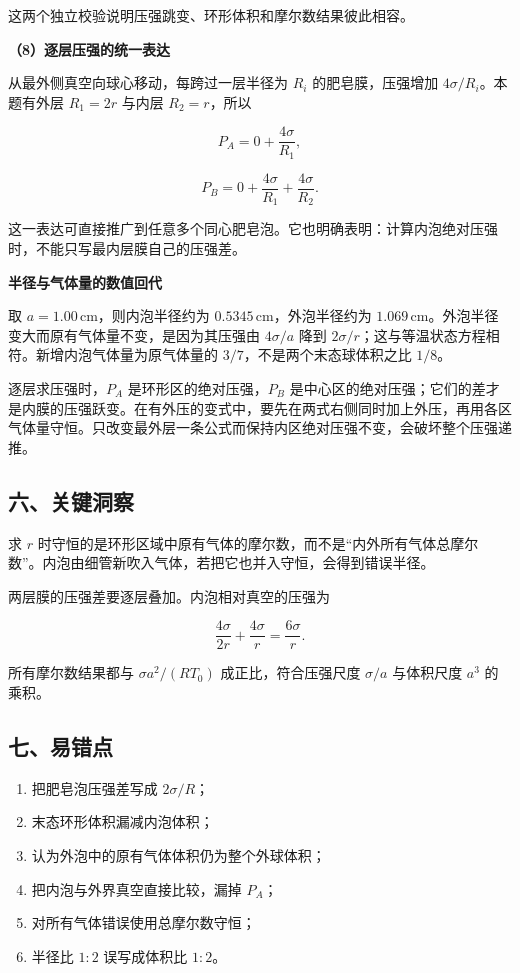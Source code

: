 \documentclass[12pt,a4paper,UTF8]{ctexart}
\newcommand{\tightlist}{\setlength{\itemsep}{0pt}\setlength{\parskip}{0pt}}
\begin{document}
这两个独立校验说明压强跳变、环形体积和摩尔数结果彼此相容。

\textbf{（8）逐层压强的统一表达}

从最外侧真空向球心移动，每跨过一层半径为 \(R_i\) 的肥皂膜，压强增加
\(4\sigma/R_i\)。本题有外层 \(R_1=2r\) 与内层 \(R_2=r\)，所以

\[
P_A=0+\frac{4\sigma}{R_1},
\]

\[
P_B=0+\frac{4\sigma}{R_1}+\frac{4\sigma}{R_2}.
\tag{22}
\]

这一表达可直接推广到任意多个同心肥皂泡。它也明确表明：计算内泡绝对压强时，不能只写最内层膜自己的压强差。

\textbf{半径与气体量的数值回代}

取 \(a=1.00\,\mathrm{cm}\)，则内泡半径约为
\(0.5345\,\mathrm{cm}\)，外泡半径约为
\(1.069\,\mathrm{cm}\)。外泡半径变大而原有气体量不变，是因为其压强由
\(4\sigma/a\) 降到
\(2\sigma/r\)；这与等温状态方程相符。新增内泡气体量为原气体量的
\(3/7\)，不是两个末态球体积之比 \(1/8\)。

逐层求压强时，\(P_A\) 是环形区的绝对压强，\(P_B\)
是中心区的绝对压强；它们的差才是内膜的压强跃变。在有外压的变式中，要先在两式右侧同时加上外压，再用各区气体量守恒。只改变最外层一条公式而保持内区绝对压强不变，会破坏整个压强递推。

\subsection{六、关键洞察}\label{ux516dux5173ux952eux6d1eux5bdf-3}

求 \(r\)
时守恒的是环形区域中原有气体的摩尔数，而不是``内外所有气体总摩尔数''。内泡由细管新吹入气体，若把它也并入守恒，会得到错误半径。

两层膜的压强差要逐层叠加。内泡相对真空的压强为

\[
\frac{4\sigma}{2r}+\frac{4\sigma}{r}
=\frac{6\sigma}{r}.
\]

所有摩尔数结果都与 \(\sigma a^2/(RT_0)\) 成正比，符合压强尺度
\(\sigma/a\) 与体积尺度 \(a^3\) 的乘积。

\subsection{七、易错点}\label{ux4e03ux6613ux9519ux70b9-3}

\begin{enumerate}
\def\labelenumi{\arabic{enumi}.}
\tightlist
\item
  把肥皂泡压强差写成 \(2\sigma/R\)；
\item
  末态环形体积漏减内泡体积；
\item
  认为外泡中的原有气体体积仍为整个外球体积；
\item
  把内泡与外界真空直接比较，漏掉 \(P_A\)；
\item
  对所有气体错误使用总摩尔数守恒；
\item
  半径比 \(1:2\) 误写成体积比 \(1:2\)。
\end{enumerate}
\end{document}
